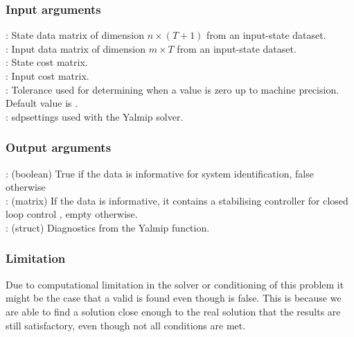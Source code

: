 \subsubsection*{Input arguments}
\textbf{}: State data matrix of dimension $n \times (T+1)$ from an input-state dataset.\\
\textbf{}: Input data matrix of dimension $m \times T$ from an input-state dataset.\\
\textbf{}: State cost matrix.\\
\textbf{}: Input cost matrix.\\
\textbf{}: Tolerance used for determining when a value is zero up to machine precision. Default value is .\\
\textbf{}: sdpsettings used with the Yalmip solver.

\subsubsection*{Output arguments}
\textbf{}: (boolean) True if the data is informative for system identification, false otherwise\\
\textbf{}: (matrix) If the data is informative, it contains a stabilising controller  for closed loop control , empty otherwise.\\
\textbf{}: (struct) Diagnostics from the Yalmip  function.

\subsubsection*{Limitation}
Due to computational limitation in the solver or conditioning of this problem it might be the case that a valid  is found even though  is false. This is because we are able to find a solution close enough to the real solution that the results are still satisfactory, even though not all conditions are met. 

